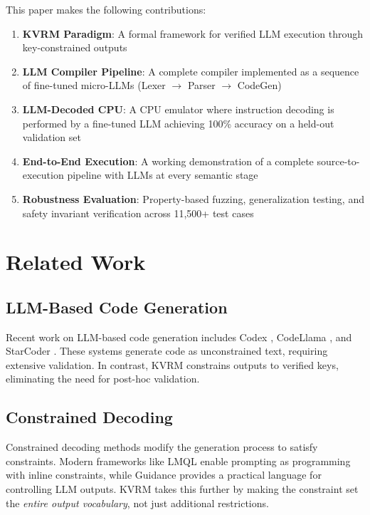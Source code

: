 \documentclass[11pt,a4paper]{article}
\begin{document}
This paper makes the following contributions:

\begin{enumerate}
    \item \textbf{KVRM Paradigm}: A formal framework for verified LLM execution through key-constrained outputs
    \item \textbf{LLM Compiler Pipeline}: A complete compiler implemented as a sequence of fine-tuned micro-LLMs (Lexer $\rightarrow$ Parser $\rightarrow$ CodeGen)
    \item \textbf{LLM-Decoded CPU}: A CPU emulator where instruction decoding is performed by a fine-tuned LLM achieving 100\% accuracy on a held-out validation set
    \item \textbf{End-to-End Execution}: A working demonstration of a complete source-to-execution pipeline with LLMs at every semantic stage
    \item \textbf{Robustness Evaluation}: Property-based fuzzing, generalization testing, and safety invariant verification across 11,500+ test cases
\end{enumerate}

\section{Related Work}
\label{sec:related}

\subsection{LLM-Based Code Generation}

Recent work on LLM-based code generation includes Codex \citep{chen2021codex}, CodeLlama \citep{roziere2023code}, and StarCoder \citep{li2023starcoder}. These systems generate code as unconstrained text, requiring extensive validation. In contrast, KVRM constrains outputs to verified keys, eliminating the need for post-hoc validation.

\subsection{Constrained Decoding}

Constrained decoding methods \citep{hokamp2017lexically, post2018fast} modify the generation process to satisfy constraints. Modern frameworks like LMQL \citep{beurer2022lmql} enable prompting as programming with inline constraints, while Guidance \citep{guidance2023} provides a practical language for controlling LLM outputs. KVRM takes this further by making the constraint set the \textit{entire output vocabulary}, not just additional restrictions.
\end{document}
